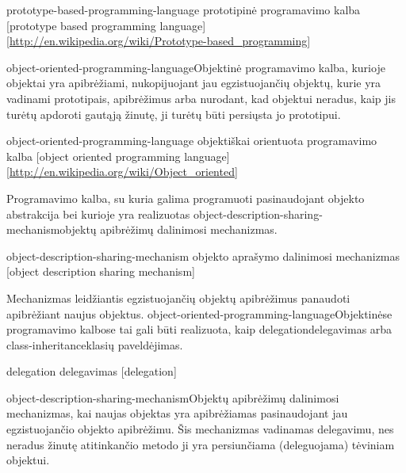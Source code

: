 \begin{glossary}
\begin{entry}
  \end{entry}%
    
  \begin{entry}%
    {prototype-based-programming-language}%
    {prototipinė programavimo kalba}%
    [prototype based programming language]%
    [\url{http://en.wikipedia.org/wiki/Prototype-based_programming}]

    \gls{object-oriented-programming-language}{Objektinė programavimo
    kalba}, kurioje objektai yra apibrėžiami, nukopijuojant jau
    egzistuojančių objektų, kurie yra vadinami prototipais,
    apibrėžimus arba nurodant, kad objektui neradus, kaip jis
    turėtų apdoroti gautąją žinutę, ji turėtų būti persiųsta
    jo prototipui.\cite[176]{Wegner:1987:DOL:38807.38823}
    
  \end{entry}
    
  \begin{entry}%
    {object-oriented-programming-language}%
    {objektiškai orientuota programavimo kalba}%
    [object oriented programming language]%
    [\url{http://en.wikipedia.org/wiki/Object_oriented}]

    Programavimo kalba, su kuria galima programuoti pasinaudojant
    objekto abstrakcija bei kurioje yra realizuotas 
    \gls{object-description-sharing-mechanism}{objektų apibrėžimų
    dalinimosi mechanizmas}.
    
  \end{entry}

  \begin{entry}%
    {object-description-sharing-mechanism}%
    {objekto aprašymo dalinimosi mechanizmas}%
    [object description sharing mechanism]

    Mechanizmas leidžiantis egzistuojančių objektų apibrėžimus panaudoti
    apibrėžiant naujus objektus.
    \gls{object-oriented-programming-language}{Objektinėse programavimo
    kalbose} tai gali būti realizuota, kaip \gls{delegation}{delegavimas}
    arba \gls{class-inheritance}{klasių paveldėjimas}.
    
  \end{entry}

  \begin{entry}%
    {delegation}%
    {delegavimas}%
    [delegation]

    \gls{object-description-sharing-mechanism}{Objektų apibrėžimų
    dalinimosi mechanizmas}, kai naujas objektas yra apibrėžiamas
    pasinaudojant jau egzistuojančio objekto apibrėžimu. Šis
    mechanizmas vadinamas delegavimu, nes neradus žinutę atitinkančio
    metodo ji yra persiunčiama (deleguojama) tėviniam objektui.
    

\end{entry}
\end{glossary}
